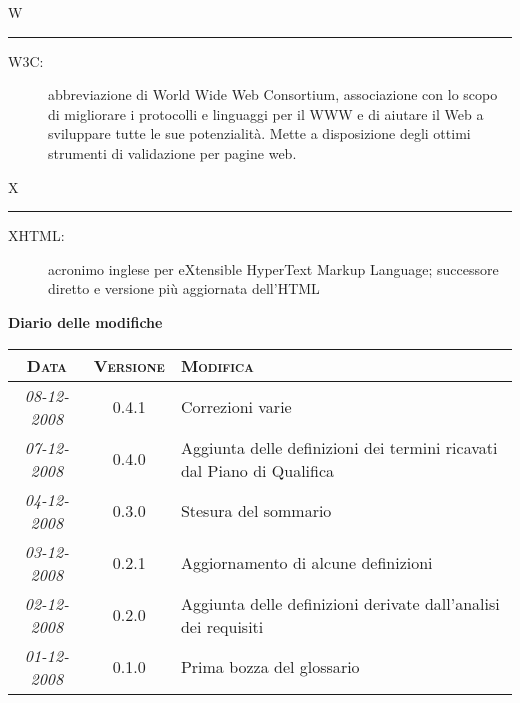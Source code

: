 \documentclass[11pt,a4paper]{article}
\newcommand{\modifiche} 
{
\newpage
\begin{center}
\textbf{Diario delle modifiche} \\
\bigskip
\begin{tabular}{|c|c|p{0.51\textwidth}|}
\hline
\textsc{Data} & \textsc{Versione} & \textsc{Modifica} \\
\hline
\hline
\textit{08-12-2008} & 0.4.1 & Correzioni varie \\
\hline
\textit{07-12-2008} & 0.4.0 & Aggiunta delle definizioni dei termini ricavati dal Piano di Qualifica \\
\hline
\textit{04-12-2008} & 0.3.0 & Stesura del sommario \\
\hline
\textit{03-12-2008} & 0.2.1 & Aggiornamento di alcune definizioni \\
\hline
\textit{02-12-2008} & 0.2.0 & Aggiunta delle definizioni derivate dall'analisi dei requisiti \\
\hline
\textit{01-12-2008} & 0.1.0 & Prima bozza del glossario \\
\hline
\end{tabular}
\end{center}
}
\begin{document}
\bigskip
\Huge W \bigskip
\hrule
\smallskip
\normalsize
\begin{description}
	\item[W3C:] abbreviazione di World Wide Web Consortium, associazione con lo scopo di migliorare i protocolli e linguaggi per il WWW e di aiutare il Web a sviluppare tutte le sue potenzialità. Mette a disposizione degli ottimi strumenti di validazione per pagine web.
\end{description}
\bigskip
\Huge X \bigskip
\hrule
\smallskip
\normalsize
\begin{description}
	\item[XHTML:] acronimo inglese per eXtensible HyperText Markup Language; successore diretto e versione più aggiornata dell'HTML
\end{description}
\modifiche
\end{document}
